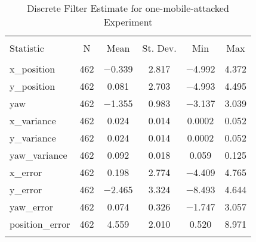 
\begin{table}[h] \centering 
  \caption{Discrete Filter Estimate for one-mobile-attacked Experiment} 
  \label{tab:one_mobile_attacked_discrete_summary} 
\begin{tabular}{@{\extracolsep{5pt}}lccccc} 
\\[-1.8ex]\hline 
\hline \\[-1.8ex] 
Statistic & \multicolumn{1}{c}{N} & \multicolumn{1}{c}{Mean} & \multicolumn{1}{c}{St. Dev.} & \multicolumn{1}{c}{Min} & \multicolumn{1}{c}{Max} \\ 
\hline \\[-1.8ex] 
x\_position & 462 & $-$0.339 & \num{2.817} & $-$4.992 & \num{4.372} \\ 
y\_position & 462 & \num{0.081} & \num{2.703} & $-$4.993 & \num{4.495} \\ 
yaw & 462 & $-$1.355 & \num{0.983} & $-$3.137 & \num{3.039} \\ 
x\_variance & 462 & \num{0.024} & \num{0.014} & \num{0.0002} & \num{0.052} \\ 
y\_variance & 462 & \num{0.024} & \num{0.014} & \num{0.0002} & \num{0.052} \\ 
yaw\_variance & 462 & \num{0.092} & \num{0.018} & \num{0.059} & \num{0.125} \\ 
x\_error & 462 & \num{0.198} & \num{2.774} & $-$4.409 & \num{4.765} \\ 
y\_error & 462 & $-$2.465 & \num{3.324} & $-$8.493 & \num{4.644} \\ 
yaw\_error & 462 & \num{0.074} & \num{0.326} & $-$1.747 & \num{3.057} \\ 
position\_error & 462 & \num{4.559} & \num{2.010} & \num{0.520} & \num{8.971} \\ 
\hline \\[-1.8ex] 
\end{tabular} 
\end{table} 

